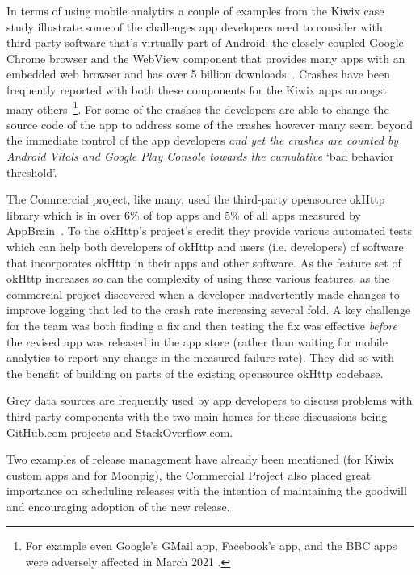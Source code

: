 In terms of using mobile analytics a couple of examples from the Kiwix case study illustrate some of the challenges app developers need to consider with third-party software that's virtually part of Android: the closely-coupled Google Chrome browser and the WebView component that provides many apps with an embedded web browser and has over 5 billion downloads~\citep{android_webview_app_2022}. Crashes have been frequently reported with both these components for the Kiwix apps amongst many others~\footnote{For example even Google's GMail app, Facebook's app, and the BBC apps were adversely affected in March 2021 \citep{bbcnews2021_google_fixes_crashing_android_app_issues}.}. For some of the crashes the developers are able to change the source code of the app to address some of the crashes however many seem beyond the immediate control of the app developers \emph{and yet the crashes are counted by Android Vitals and Google Play Console towards the cumulative} `bad behavior threshold'. 

The Commercial project, like many, used the third-party opensource okHttp library which is in over 6\% of top apps and 5\% of all apps measured by AppBrain~\citep{appbrain2022_ok_http_stats}.
%
To the okHttp's project's credit they provide various automated tests which can help both developers of okHttp and users (i.e. developers) of software that incorporates okHttp in their apps and other software. As the feature set of okHttp increases so can the complexity of using these various features, as the commercial project discovered when a developer inadvertently made changes to improve logging that led to the crash rate increasing several fold. A key challenge for the team was both finding a fix and then testing the fix was effective \emph{before} the revised app was released in the app store (rather than waiting for mobile analytics to report any change in the measured failure rate). They did so with the benefit of building on parts of the existing opensource okHttp codebase.

Grey data sources are frequently used by app developers to discuss problems with third-party components with the two main homes for these discussions being GitHub.com projects and StackOverflow.com.


Two examples of release management have already been mentioned (for Kiwix custom apps and for Moonpig), the Commercial Project also placed great importance on scheduling releases with the intention of maintaining the goodwill and encouraging adoption of the new release. 

